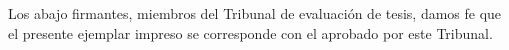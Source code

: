 \documentclass[spanish,a4paper,oneside,10pt,openright]{book}
\begin{document}
 \cleardoublepage %

 \cleardoublepage %

 \cleardoublepage %

 \cleardoublepage %

 \cleardoublepage %

 \cleardoublepage %








\phantom{p. 1}
\clearpage
\cleardoublepage
{}



\clearpage
\cleardoublepage

\thispagestyle{plain}
Los abajo firmantes, miembros del Tribunal de evaluación de tesis, damos fe que el presente ejemplar impreso se corresponde con el aprobado por este Tribunal.
\end{document}
